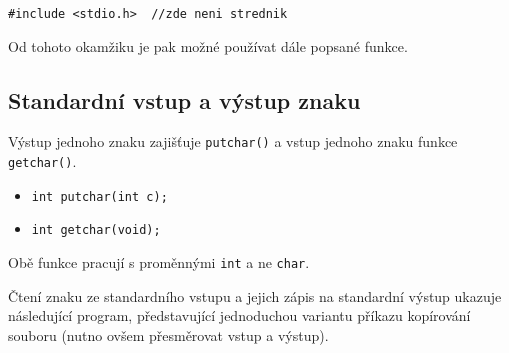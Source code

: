       \lstinline[basicstyle=\ttfamily]!#include <stdio.h>  //zde neni strednik!
  
      Od tohoto okamžiku je pak možné používat dále popsané funkce.
  
    \subsection{Standardní vstup a výstup znaku}
      Výstup jednoho znaku zajišťuje \lstinline[basicstyle=\ttfamily]!putchar()! a vstup jednoho 
      znaku funkce \lstinline[basicstyle=\ttfamily]!getchar()!.
      \begin{itemize}
        \item \lstinline[basicstyle=\ttfamily]!int putchar(int c);!
        \item \lstinline[basicstyle=\ttfamily]!int getchar(void);!
      \end{itemize}
      Obě funkce pracují s proměnnými \lstinline[basicstyle=\ttfamily]!int! a ne 
      \lstinline[basicstyle=\ttfamily]!char!.
  
         
      
      \begin{example}Čtení znaku ze standardního vstupu a jejich zápis na standardní výstup 
        ukazuje následující program, představující jednoduchou variantu příkazu kopírování souboru 
        (nutno ovšem přesměrovat vstup a výstup).
  
        
      \end{example}
      
